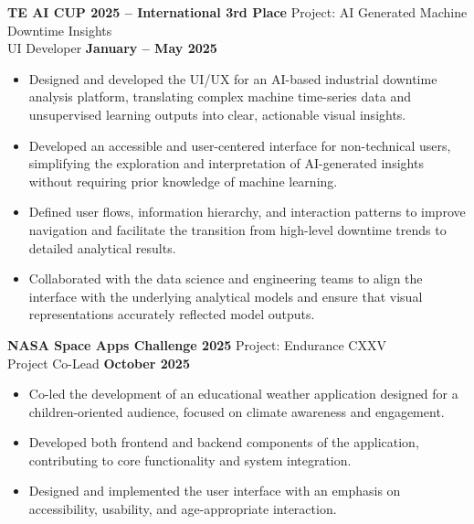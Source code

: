 \documentclass[11pt]{article}
\begin{document}
\textbf{TE AI CUP 2025 -- International 3rd Place} \hfill Project: AI Generated Machine Downtime Insights\\
UI Developer \hfill \textbf{January -- May 2025}
\vspace{-0.3cm}
\begin{itemize}[leftmargin=*]
    \item Designed and developed the UI/UX for an AI-based industrial downtime analysis platform, translating complex machine time-series data and unsupervised learning outputs into clear, actionable visual insights.
    
    \vspace{-0.3cm}
    \item Developed an accessible and user-centered interface for non-technical users, simplifying the exploration and interpretation of AI-generated insights without requiring prior knowledge of machine learning.
    
    \vspace{-0.3cm}
    \item Defined user flows, information hierarchy, and interaction patterns to improve navigation and facilitate the transition from high-level downtime trends to detailed analytical results.

    \vspace{-0.3cm} 
    \item Collaborated with the data science and engineering teams to align the interface with the underlying analytical models and ensure that visual representations accurately reflected model outputs.
\end{itemize}



\textbf{NASA Space Apps Challenge 2025} \hfill Project: Endurance CXXV\\
Project Co-Lead \hfill \textbf{October 2025}
\vspace{-0.3cm}
\begin{itemize}[leftmargin=*]
    \item Co-led the development of an educational weather application designed for a children-oriented audience, focused on climate awareness and engagement.
    
    \vspace{-0.3cm}
    \item Developed both frontend and backend components of the application, contributing to core functionality and system integration.
    
    \vspace{-0.3cm}
    \item Designed and implemented the user interface with an emphasis on accessibility, usability, and age-appropriate interaction.
\end{itemize}
\end{document}
